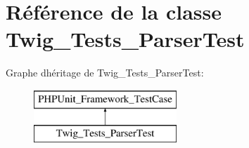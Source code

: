 \hypertarget{class_twig___tests___parser_test}{}\section{Référence de la classe Twig\+\_\+\+Tests\+\_\+\+Parser\+Test}
\label{class_twig___tests___parser_test}
Graphe d\textquotesingle{}héritage de Twig\+\_\+\+Tests\+\_\+\+Parser\+Test\+:\begin{figure}[H]
\begin{center}
\leavevmode
\includegraphics[height=2.000000cm]{class_twig___tests___parser_test}
\end{center}
\end{figure}
